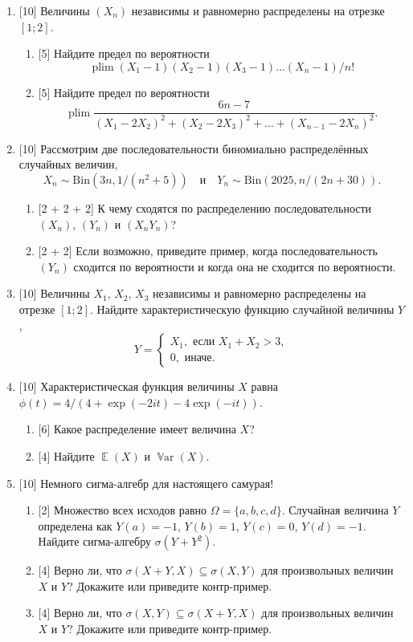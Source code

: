 \documentclass[12pt]{article}
\DeclareMathOperator{\Var}{\mathbb{V}ar}
\DeclareMathOperator{\E}{\mathbb{E}}
\DeclareMathOperator{\plim}{plim}
\newcommand{\dBin}{\mathrm{Bin}}
\begin{document}
\begin{enumerate}
\item {[10]} Величины $(X_n)$ независимы и равномерно распределены на отрезке $[1; 2]$.
\begin{enumerate}
\item {[5]} Найдите предел по вероятности
\[
\plim (X_1 - 1)(X_2 - 1)(X_3 - 1) \dots (X_n - 1) / n!
\]
\item {[5]} Найдите предел по вероятности 
\[
    \plim \frac{6n - 7}{(X_1 - 2X_2)^2 + (X_2 - 2X_3)^2 + \dots + (X_{n-1} - 2X_n)^2}.
\]
\end{enumerate}

\item {[10]} Рассмотрим две последовательности биномиально распределённых случайных величин, 
\[
X_n \sim \dBin(3n, 1/(n^2 + 5)) \quad \text{и} \quad Y_n \sim \dBin(2025, n/(2n + 30)).
\]
\begin{enumerate}
    \item {[2 + 2 + 2]} К чему сходятся по распределению последовательности $(X_n)$, $(Y_n)$ и $(X_n Y_n)$?
    \item {[2 + 2]} Если возможно, приведите пример, когда последовательность $(Y_n)$ сходится по вероятности и когда она не сходится по вероятности.
\end{enumerate}

\item {[10]} Величины $X_1$, $X_2$, $X_3$ независимы и равномерно распределены на отрезке $[1;2]$.
Найдите характеристическую функцию случайной величины $Y$,
\[
Y = \begin{cases}
    X_1, \text{ если } X_1 + X_2 > 3, \\
    0, \text{ иначе.}
\end{cases}
\]

\item {[10]} Характеристическая функция величины $X$ равна $\phi(t) = 4/(4 + \exp(-2it) - 4\exp(-it))$.
\begin{enumerate}
    \item {[6]} Какое распределение имеет величина $X$?
    \item {[4]} Найдите $\E(X)$ и $\Var(X)$.
\end{enumerate}


\item {[10]} Немного сигма-алгебр для настоящего самурая!
\begin{enumerate}
    \item {[2]} Множество всех исходов равно $\Omega = \{a, b, c, d\}$. 
    Случайная величина $Y$ определена как $Y(a) = -1$, $Y(b) = 1$, $Y(c) = 0$, $Y(d) = -1$.
    Найдите сигма-алгебру $\sigma(Y + Y^2)$.
    \item {[4]} Верно ли, что $\sigma(X + Y, X) \subseteq \sigma(X, Y)$ для произвольных величин $X$ и $Y$? Докажите или приведите контр-пример.
    \item {[4]} Верно ли, что $\sigma(X, Y) \subseteq \sigma(X + Y, X)$ для произвольных величин $X$ и $Y$? Докажите или приведите контр-пример.
\end{enumerate}


\end{enumerate}
\end{document}
